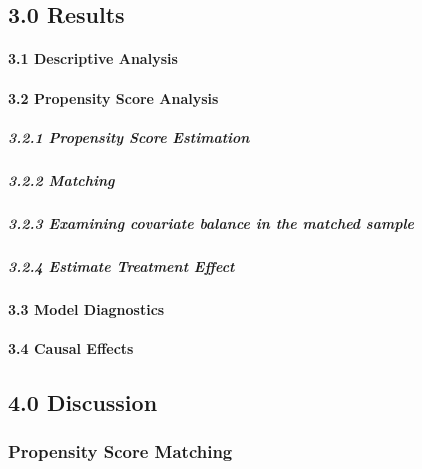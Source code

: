 \documentclass[]{article}
\let\oldparagraph\paragraph
\renewcommand{\paragraph}[1]{\oldparagraph{#1}\mbox{}}
\let\oldsubparagraph\subparagraph
\renewcommand{\subparagraph}[1]{\oldsubparagraph{#1}\mbox{}}
\begin{document}
\hypertarget{results}{%
\subsection{3.0 Results}\label{results}}

\hypertarget{descriptive-analysis-1}{%
\paragraph{3.1 Descriptive Analysis}\label{descriptive-analysis-1}}

\hypertarget{propensity-score-analysis-1}{%
\paragraph{3.2 Propensity Score Analysis}\label{propensity-score-analysis-1}}

\hypertarget{propensity-score-estimation-2}{%
\subparagraph{3.2.1 Propensity Score Estimation}\label{propensity-score-estimation-2}}

\hypertarget{matching-1}{%
\subparagraph{3.2.2 Matching}\label{matching-1}}

\hypertarget{examining-covariate-balance-in-the-matched-sample-2}{%
\subparagraph{3.2.3 Examining covariate balance in the matched sample}\label{examining-covariate-balance-in-the-matched-sample-2}}

\hypertarget{estimate-treatment-effect-1}{%
\subparagraph{3.2.4 Estimate Treatment Effect}\label{estimate-treatment-effect-1}}

\hypertarget{model-diagnostics-1}{%
\paragraph{3.3 Model Diagnostics}\label{model-diagnostics-1}}

\hypertarget{causal-effects}{%
\paragraph{3.4 Causal Effects}\label{causal-effects}}

\hypertarget{discussion}{%
\subsection{4.0 Discussion}\label{discussion}}

\hypertarget{propensity-score-matching-1}{%
\subsubsection{Propensity Score Matching}\label{propensity-score-matching-1}}
\end{document}
